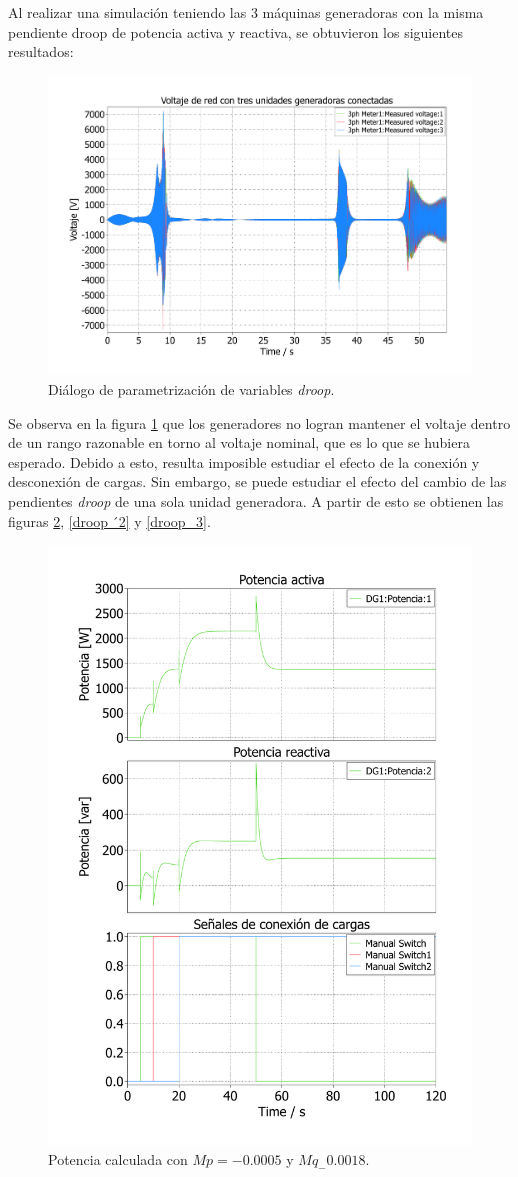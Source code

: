 Al realizar una simulación teniendo las 3 máquinas generadoras con la misma pendiente droop de potencia activa y reactiva, se obtuvieron los siguientes resultados:

\begin{figure}
   \centering
   \includegraphics[width=0.5\linewidth]{Tarea 1/report/imagenes/p3a/resonancia_generadores.pdf}
   \caption{Diálogo de parametrización de variables \textit{droop}.}
   \label{resonancia_generadores}
\end{figure}

Se observa en la figura \ref{resonancia_generadores} que los generadores no logran mantener el voltaje dentro de un rango razonable en torno al voltaje nominal, que es lo que se hubiera esperado. Debido a esto, resulta imposible estudiar el efecto de la conexión y desconexión de cargas. Sin embargo, se puede estudiar el efecto del cambio de las pendientes \textit{droop} de una sola unidad generadora. A partir de esto se obtienen las figuras \ref{droop_1}, \ref{droop_́2} y \ref{droop_3}.


\begin{figure}
   \centering
   \includegraphics[width=0.5\linewidth]{Tarea 1/report/imagenes/p3a/droop_1.pdf}
   \caption{Potencia calculada con $Mp = -0.0005$ y $Mq_-0.0018$.}
   \label{droop_1}
\end{figure}

